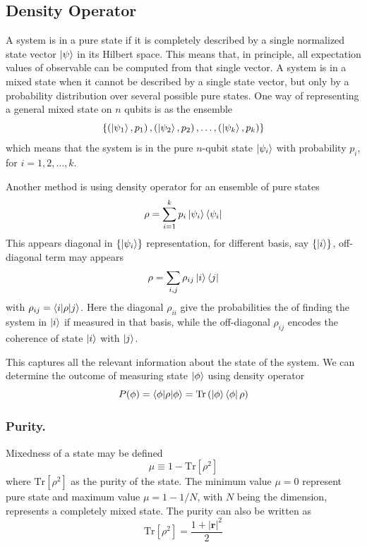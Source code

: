 \documentclass[../../../main.tex]{subfiles}
\begin{document}
\subsection{Density Operator}
A system is in a pure state if it is completely described by a single normalized state vector $ \ket{\psi}$ in its Hilbert space.
This means that, in principle, all expectation values of observable can be computed from that single vector.
A system is in a mixed state when it cannot be described by a single state vector, but only by a probability distribution over several possible pure states.
One way of representing a general mixed state on $n$ qubits is as the ensemble
\begin{equation*}
    \left\{ \left( \ket{\psi_1}, p_1 \right), \left( \ket{\psi_2}, p_2 \right), \ldots, \left( \ket{\psi_k}, p_k \right) \right\}
\end{equation*}
which means that the system is in the pure $n$-qubit state \(\ket{\psi_i}\) with probability \(p_i\), for \(i = 1, 2, \ldots, k\).

Another method is using density operator for an ensemble of pure states
\begin{equation*}
    \rho = \sum_{i=1}^{k} p_i \ket{\psi_i} \langle \psi_i|
\end{equation*}
This appears diagonal in $\left\{ \ket{\psi_i} \right\} $ representation, for different basis, say $\left\{ \ket{i } \right\} $, off-diagonal term may appears
\begin{equation*}
    \rho =\sum_{i,j } \rho_{ij} \ket{i }\bra{j}
\end{equation*}
with $\rho_{ij}=\braket{i  | \rho|j}$.
Here the diagonal $\rho_{ii}$ give the probabilities the of finding the system in $\ket{i}$ if measured in that basis, while the off-diagonal $\rho_{ij}$ encodes the coherence of state $\ket{i }$ with $\ket{j}$.

This captures all the relevant information about the state of the system.
We can determine the outcome of measuring state $\ket{\phi}$ using density operator
\begin{equation*}
    P(\phi)= \braket{\phi  | \rho|\phi}= \mathrm{Tr } \left( \ket{\phi }\bra{\phi }\rho \right)
\end{equation*}

\subsubsection{Purity.}
Mixedness of a state may be defined
\begin{equation*}
    \mu \equiv 1 - \mathrm{Tr} [\rho^2]
\end{equation*}
where $\mathrm{Tr} [\rho^2]$ as the purity of the state.
The minimum value $\mu=0$ represent pure state and maximum value $\mu=1-1/N$, with $N$ being the dimension, represents a completely mixed state.
The purity can also be written as 
\begin{equation*}
  \mathrm{Tr} [\rho^2] = \frac{1 + |\mathbf{r}|^2}{2}
\end{equation*}
\end{document}
